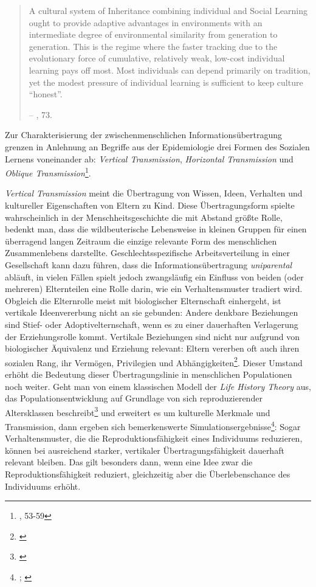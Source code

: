 \documentclass[openany,twoside,twocolumn]{book}
\let\rmarkdownfootnote\footnote%
\def\footnote{\protect\rmarkdownfootnote}
\begin{document}
\begin{quote}
A cultural system of Inheritance combining individual and Social Learning ought to provide adaptive advantages in environments with an intermediate degree of environmental similarity from generation to generation. This is the regime where the faster tracking due to the evolutionary force of cumulative, relatively weak, low-cost individual learning pays off most. Most individuals can depend primarily on tradition, yet the modest pressure of individual learning is sufficient to keep culture ``honest''.

-- \textcite{smith_cultural_1992}, 73.
\end{quote}

Zur Charakterisierung der zwischenmenschlichen Informationsübertragung grenzen \textcite{cavalli-sforza_cultural_1981} in Anlehnung an Begriffe aus der Epidemiologie drei Formen des Sozialen Lernens voneinander ab: \emph{Vertical Transmission}, \emph{Horizontal Transmission} und \emph{Oblique Transmission}\footnote{\textcite{cavalli-sforza_cultural_1981}, 53-59}.

\emph{Vertical Transmission} meint die Übertragung von Wissen, Ideen, Verhalten und kultureller Eigenschaften von Eltern zu Kind. Diese Übertragungsform spielte wahrscheinlich in der Menschheitsgeschichte die mit Abstand größte Rolle, bedenkt man, dass die wildbeuterische Lebensweise in kleinen Gruppen für einen überragend langen Zeitraum die einzige relevante Form des menschlichen Zusammenlebens darstellte. Geschlechtsspezifische Arbeitsverteilung in einer Gesellschaft kann dazu führen, dass die Informationsübertragung \emph{uniparental} abläuft, in vielen Fällen spielt jedoch zwangsläufig ein Einfluss von beiden (oder mehreren) Elternteilen eine Rolle darin, wie ein Verhaltensmuster tradiert wird. Obgleich die Elternrolle meist mit biologischer Elternschaft einhergeht, ist vertikale Ideenvererbung nicht an sie gebunden: Andere denkbare Beziehungen sind Stief- oder Adoptivelternschaft, wenn es zu einer dauerhaften Verlagerung der Erziehungsrolle kommt. Vertikale Beziehungen sind nicht nur aufgrund von biologischer Äquivalenz und Erziehung relevant: Eltern vererben oft auch ihren sozialen Rang, ihr Vermögen, Privilegien und Abhängigkeiten\footnote{\textcite{mulder_intergenerational_2009}}. Dieser Umstand erhöht die Bedeutung dieser Übertragungslinie in menschlichen Populationen noch weiter. Geht man von einem klassischen Modell der \emph{Life History Theory} aus, das Populationsentwicklung auf Grundlage von sich reproduzierender Altersklassen beschreibt\footnote{\textcite{leslie_further_1948}} und erweitert es um kulturelle Merkmale und Transmission, dann ergeben sich bemerkenswerte Simulationsergebnisse\footnote{\textcite{coratenuto_age_1989}; \textcite{fogarty_role_2013}}: Sogar Verhaltensmuster, die die Reproduktionsfähigkeit eines Individuums reduzieren, können bei ausreichend starker, vertikaler Übertragungsfähigkeit dauerhaft relevant bleiben. Das gilt besonders dann, wenn eine Idee zwar die Reproduktionsfähigkeit reduziert, gleichzeitig aber die Überlebenschance des Individuums erhöht.
\end{document}
